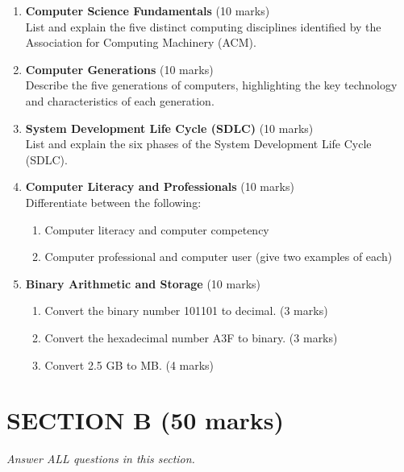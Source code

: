 \documentclass[12pt]{article}
\begin{document}
\begin{enumerate}[left=0pt, label=\bfseries Q\arabic*.]
    \item \textbf{Computer Science Fundamentals} \hfill (10 marks)\\
          List and explain the five distinct computing disciplines identified by the Association for Computing Machinery (ACM).

    \item \textbf{Computer Generations} \hfill (10 marks)\\
          Describe the five generations of computers, highlighting the key technology and characteristics of each generation.

    \item \textbf{System Development Life Cycle (SDLC)} \hfill (10 marks)\\
          List and explain the six phases of the System Development Life Cycle (SDLC).

    \item \textbf{Computer Literacy and Professionals} \hfill (10 marks)\\
          Differentiate between the following:
          \begin{enumerate}[label=(\alph*)]
              \item Computer literacy and computer competency
              \item Computer professional and computer user (give two examples of each)
          \end{enumerate}

    \item \textbf{Binary Arithmetic and Storage} \hfill (10 marks)\\
          \begin{enumerate}[label=(\alph*)]
              \item Convert the binary number 101101 to decimal. \hfill (3 marks)
              \item Convert the hexadecimal number A3F to binary. \hfill (3 marks)
              \item Convert 2.5 GB to MB. \hfill (4 marks)
          \end{enumerate}
\end{enumerate}

\newpage

\section*{SECTION B (50 marks)}
\textit{Answer ALL questions in this section.}
\end{document}
